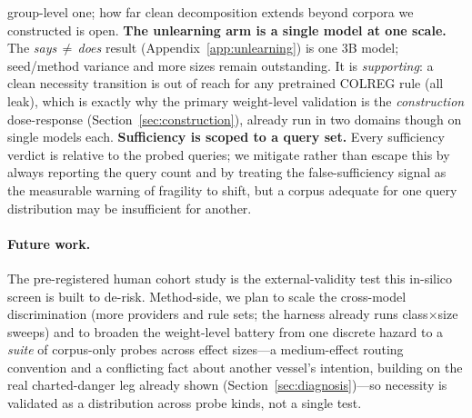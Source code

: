\documentclass{article}
\begin{document}
group-level one; how far clean decomposition extends beyond corpora we constructed is open.
\textbf{The unlearning arm is a single model at one scale.} The \emph{says\,$\neq$\,does} result
(Appendix~\ref{app:unlearning}) is one 3B model; seed/method variance and more sizes remain outstanding.
It is \emph{supporting}: a clean necessity transition is out of reach for any pretrained COLREG rule (all
leak), which is exactly why the primary weight-level validation is the \emph{construction} dose-response
(Section~\ref{sec:construction}), already run in two domains though on single models each.
\textbf{Sufficiency is scoped to a query set.} Every sufficiency verdict is relative
to the probed queries; we mitigate rather than escape this by always reporting the query count
and by treating the false-sufficiency signal as the measurable warning of fragility to shift,
but a corpus adequate for one query distribution may be insufficient for another.

\paragraph{Future work.} The pre-registered human cohort study is the external-validity test this
in-silico screen is built to de-risk. Method-side, we plan to scale the cross-model discrimination
(more providers and rule sets; the harness already runs class$\times$size sweeps) and to broaden the
weight-level battery from one discrete hazard to a \emph{suite} of corpus-only probes across effect
sizes---a medium-effect routing convention and a conflicting fact about another vessel's intention,
building on the real charted-danger leg already shown (Section~\ref{sec:diagnosis})---so necessity is
validated as a distribution across probe kinds, not a single test.
\end{document}
